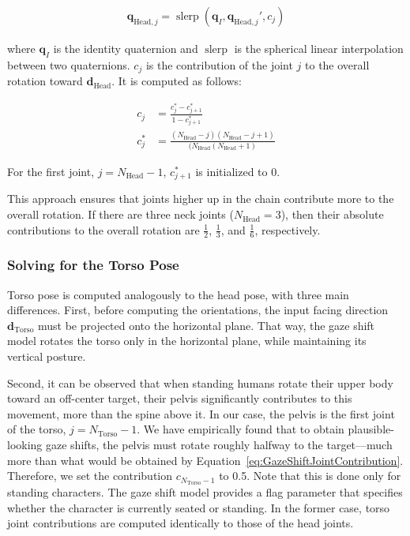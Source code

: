 \begin{align}
\label{eq:GazeShiftJointOrientation}
\mathbf{q}_{\mathrm{Head},j} = \mathop{slerp}(\mathbf{q}_I, \mathbf{q}_{\mathrm{Head},j}', c_j)
\end{align}

where $\mathbf{q}_I$ is the identity quaternion and $\mathop{slerp}$ is the spherical linear interpolation between two quaternions. $c_j$ is the contribution of the joint $j$ to the overall rotation toward $\mathbf{d}_{\mathrm{Head}}$. It is computed as follows:

\begin{align}
\label{eq:GazeShiftJointContribution}
c_j &= \frac{c_j^* - c_{j+1}^*}{1 - c_{j+1}^*} \\
c_j^* &= \frac{(N_{\mathrm{Head}} - j)(N_{\mathrm{Head}} - j + 1)}{(N_{\mathrm{Head}} (N_{\mathrm{Head}} + 1)}
\end{align}

For the first joint, $j = N_{\mathrm{Head}} - 1$, $c_{j+1}^*$ is initialized to 0.

This approach ensures that joints higher up in the chain contribute more to the overall rotation. If there are three neck joints ($N_{\mathrm{Head}} = 3$), then their absolute contributions to the overall rotation are $\frac{1}{2}$, $\frac{1}{3}$, and $\frac{1}{6}$, respectively.

\subsubsection{Solving for the Torso Pose}

Torso pose is computed analogously to the head pose, with three main differences. First, before computing the orientations, the input facing direction $\mathbf{d}_{\mathrm{Torso}}$ must be projected onto the horizontal plane. That way, the gaze shift model rotates the torso only in the horizontal plane, while maintaining its vertical posture.

Second, it can be observed that when standing humans rotate their upper body toward an off-center target, their pelvis significantly contributes to this movement, more than the spine above it. In our case, the pelvis is the first joint of the torso, $j = N_{\mathrm{Torso}} - 1$. We have empirically found that to obtain plausible-looking gaze shifts, the pelvis must rotate roughly halfway to the target---much more than what would be obtained by Equation~\ref{eq:GazeShiftJointContribution}. Therefore, we set the contribution $c_{N_{\mathrm{Torso}} -1}$ to 0.5. Note that this is done only for standing characters. The gaze shift model provides a flag parameter that specifies whether the character is currently seated or standing. In the former case, torso joint contributions are computed identically to those of the head joints.


